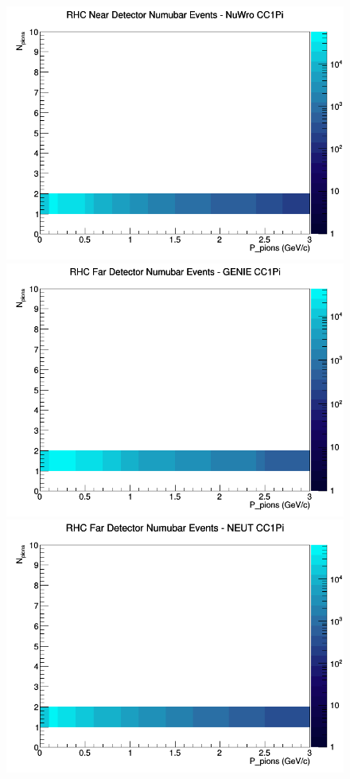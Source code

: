 \documentclass[12pt]{article}
\begin{document}
\begin{figure}[h]
\includegraphics[width=\linewidth]{N_P/nominal/pions/CC1Pi_RHC_ND_numubar_N_P_NuWro.png}
\endminipage
\newline
{}
\includegraphics[width=\linewidth]{N_P/nominal/pions/CC1Pi_RHC_FD_numubar_N_P_GENIE.png}
\endminipage
{}
\includegraphics[width=\linewidth]{N_P/nominal/pions/CC1Pi_RHC_FD_numubar_N_P_NEUT.png}

\end{figure}
\end{document}

